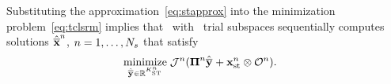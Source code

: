 \begin{comment}
each window, we introduce the space--time trial subspace
$$ \stateArgnt{n} \in \stspaceSTArg{n} \subseteq \RR{N} \otimes \timeSpaceArg{n},$$
along with the space--time trial basis matrix \textit{function}, 
\begin{align*}
\stbasisArgnt{n} &: t \mapsto \stbasis(t) \\
 &: [\timeStartArg{n},\timeEndArg{n}] \rightarrow  \RR{N \times \stdimArg{n}}  ,%
\end{align*}
\KTC{shouldn't be $\equiv$. Look earlier for this. the right hand side should
be on the left with $\defeq$.} with $\Range{\stbasisArgnt{n}} + \stateInterceptSTArg{} \equiv \stspaceSTArg{n} $ and where $\stdimArg{n}$ is the number of space--time generalized coordinates over the $n$th window. 
For simplicity we assume the reference state to be equivalent for each time window, although no such requirement is necessary. 
\KTC{Remove all commas before equations unless it makes sense gramatically.
Add the $n$ superscript to $x_{ref}$}
The state over each window is approximated by,
\begin{equation}\label{eq:stapprox}
 \stateFOMArg{n}{t} \approx \approxstateArg{n}{t}  = \stbasisArg{n}{t} \stgenstateArg{n} + \stateInterceptSTArg{},
\end{equation}

\end{comment}
Substituting the approximation~\eqref{eq:stapprox} into the minimization problem~\eqref{eq:tclsrm} implies that \methodAcronym\ with \spaceTimeAcronym\ trial subspaces sequentially computes solutions $\hat{\mathbf{\overline{x}}}^{n}$, $n = 1,\ldots,N_s$ that satisfy
\begin{align}\label{eq:obj_gen_slab_spacetime}
\begin{split}
&\underset{\stgenstateyArg{} \in \RR{\stdimArg{n}}}{\text{minimize}}\; \mathcal{J}^n( \stbasisArgnt{n} \stgenstateyArg{} + \stateInterceptSTArg{n} \otimes \onesFunctionArg{n} ).%
\end{split}
\end{align}
